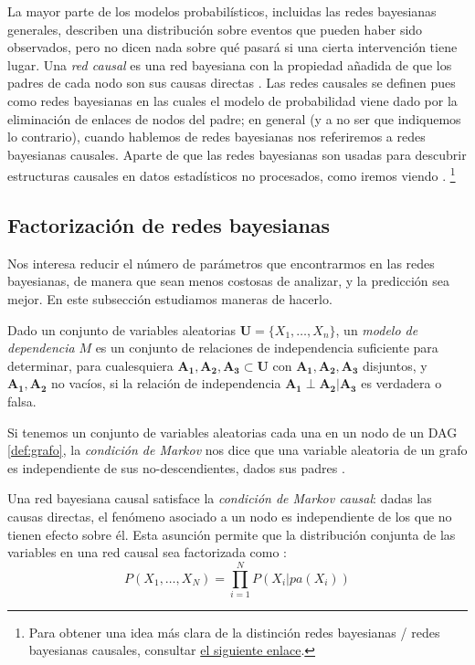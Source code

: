 La mayor parte de los modelos probabilísticos, incluidas las redes bayesianas generales, describen 
una distribución sobre eventos que pueden haber sido observados, pero no dicen nada sobre qué pasará 
si una cierta intervención tiene lugar. Una {\em red causal} es una red bayesiana 
con la propiedad añadida de que los padres de cada nodo son sus causas directas \cite{pearl-and-rusell}. 
Las redes causales se definen pues como redes bayesianas en las cuales el modelo de probabilidad 
viene dado por la eliminación de enlaces de nodos del padre; en general (y a no ser que indiquemos lo contrario), 
cuando hablemos de redes bayesianas nos referiremos a redes bayesianas causales.
Aparte de que las redes bayesianas son usadas para descubrir estructuras causales en datos estadísticos no 
procesados, como iremos viendo \cite{causal-discov}. \footnote{Para obtener una idea más clara de la distinción redes bayesianas / redes bayesianas causales, consultar 
\href{https://armahmood.github.io/files/mahmood-TR11-01.pdf}{el siguiente enlace}.}

\subsection{Factorización de redes bayesianas}
Nos interesa reducir el número de parámetros que encontrarmos en las redes bayesianas, de manera que sean menos 
costosas de analizar, y la predicción sea mejor. En este subsección estudiamos maneras de hacerlo.

Dado un conjunto de variables aleatorias $\mathbf{U} = \{X_1, \dots, X_n\}$, un {\em modelo de dependencia} $M$ 
es un conjunto de relaciones de independencia suficiente para determinar, para cualesquiera $\mathbf{A_1}, 
\mathbf{A_2}, \mathbf{A_3} \subset \mathbf{U}$ con $\mathbf{A_1}, \mathbf{A_2}, \mathbf{A_3}$
disjuntos, y $\mathbf{A_1}, \mathbf{A_2}$ no vacíos, si la relación de independencia $\mathbf{A_1} \perp 
\mathbf{A_2} | \mathbf{A_3}$ es verdadera o falsa. 

Si tenemos un conjunto de variables aleatorias cada una en un nodo de un DAG \ref{def:grafo}, la {\em condición 
de Markov} nos dice que una variable aleatoria de un grafo es independiente de sus no-descendientes, dados 
sus padres \cite{markov-assumption}. 

Una red bayesiana causal satisface la {\em condición de Markov causal}: dadas las causas directas, el fenómeno 
asociado a un nodo es independiente de los que no tienen efecto sobre él. Esta asunción permite que la distribución 
conjunta de las variables en una red causal sea factorizada como \cite{LCBN}:
$$ P(X_{1}, \dots,X_{N}) = \prod_{i=1}^{N} P(X_{i} | pa(X_{i}))$$ 

